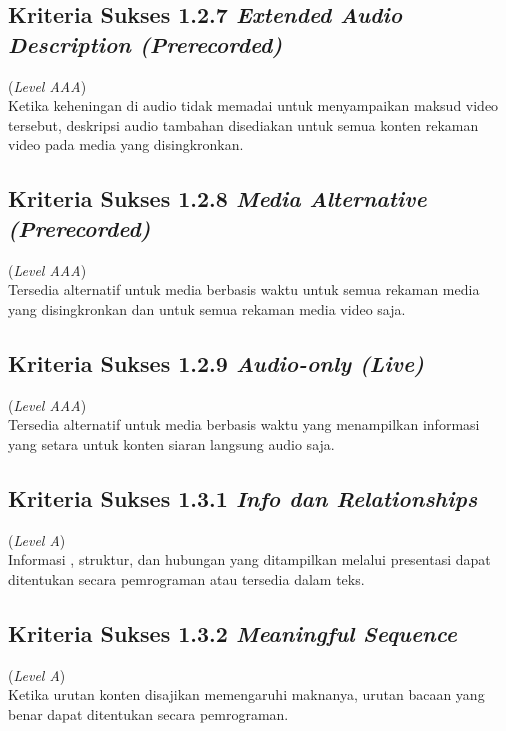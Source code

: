 \subsection{Kriteria Sukses 1.2.7 \textit{Extended Audio Description (Prerecorded)}}
\label{subsec:kriteria_1.2.7}
(\textit{Level AAA}) \\

Ketika keheningan di audio tidak memadai untuk menyampaikan maksud video tersebut, deskripsi audio tambahan disediakan untuk semua konten rekaman video pada media yang disingkronkan. 


\subsection{Kriteria Sukses 1.2.8 \textit{Media Alternative (Prerecorded)}}
\label{subsec:kriteria_1.2.8}
(\textit{Level AAA}) \\

Tersedia alternatif untuk media berbasis waktu untuk semua rekaman media yang disingkronkan dan untuk semua rekaman media video saja.

\subsection{Kriteria Sukses 1.2.9 \textit{Audio-only (Live)}}
\label{subsec:kriteria_1.2.9}
(\textit{Level AAA}) \\

Tersedia alternatif untuk media berbasis waktu yang menampilkan informasi yang setara untuk konten siaran langsung audio saja.


\subsection{Kriteria Sukses 1.3.1 \textit{Info dan Relationships}}
\label{subsec:kriteria_1.3.1}
(\textit{Level A}) \\

Informasi , struktur, dan hubungan yang ditampilkan melalui presentasi dapat ditentukan secara pemrograman atau tersedia dalam teks.


\subsection{Kriteria Sukses 1.3.2 \textit{Meaningful Sequence}}
\label{subsec:kriteria_1.3.2}
(\textit{Level A}) \\

Ketika urutan konten disajikan memengaruhi maknanya, urutan bacaan yang benar dapat ditentukan secara pemrograman.


